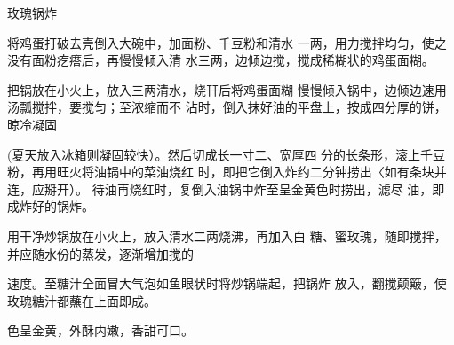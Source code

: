 \begin{recipe}{玫瑰锅炸}

\ingredients



\cooking

\step 	将鸡蛋打破去壳倒入大碗中，加面粉、千豆粉和清水 一两，用力搅拌均匀，使之没有面粉疙瘩后，再慢慢倾入清 水三两，边倾边搅，搅成稀糊状的鸡蛋面糊。

\step 	把锅放在小火上，放入三两清水，烧幵后将鸡蛋面糊 慢慢倾入锅中，边倾边速用汤瓢搅拌，要搅匀；至浓缩而不 沾时，倒入抹好油的平盘上，按成四分厚的饼，晾冷凝固

(夏天放入冰箱则凝固较快）。然后切成长一寸二、宽厚四 分的长条形，滚上千豆粉，再用旺火将油锅中的菜油烧红 时，即把它倒入炸约二分钟捞出〈如有条块并连，应掰开）。 待油再烧红时，复倒入油锅中炸至呈金黄色时捞出，滤尽 油，即成炸好的锅炸。

\step 用干净炒锅放在小火上，放入清水二两烧沸，再加入白 糖、蜜玫瑰，随即搅拌，并应随水份的蒸发，逐渐增加搅的

速度。至糖汁全面冒大气泡如鱼眼状时将炒锅端起，把锅炸 放入，翻搅颠簸，使玫瑰糖汁都蘸在上面即成。

\notes

色呈金黄，外酥内嫩，香甜可口。

\end{recipe}

